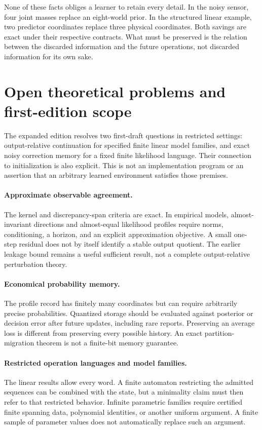 \documentclass[11pt,letterpaper]{article}
\theoremstyle{plain}
\theoremstyle{definition}
\begin{document}
None of these facts obliges a learner to retain every detail. In the noisy sensor, four joint masses replace an eight-world prior. In the structured linear example, two predictor coordinates replace three physical coordinates. Both savings are exact under their respective contracts. What must be preserved is the relation between the discarded information and the future operations, not discarded information for its own sake.

\section{Open theoretical problems and first-edition scope}\label{sec:open}
The expanded edition resolves two first-draft questions in restricted settings: output-relative continuation for specified finite linear model families, and exact noisy correction memory for a fixed finite likelihood language. Their connection to initialization is also explicit. This is not an implementation program or an assertion that an arbitrary learned environment satisfies those premises.

\paragraph{Approximate observable agreement.}
The kernel and discrepancy-span criteria are exact. In empirical models, almost-invariant directions and almost-equal likelihood profiles require norms, conditioning, a horizon, and an explicit approximation objective. A small one-step residual does not by itself identify a stable output quotient. The earlier leakage bound remains a useful sufficient result, not a complete output-relative perturbation theory.

\paragraph{Economical probability memory.}
The profile record has finitely many coordinates but can require arbitrarily precise probabilities. Quantized storage should be evaluated against posterior or decision error after future updates, including rare reports. Preserving an average loss is different from preserving every possible history. An exact partition-migration theorem is not a finite-bit memory guarantee.

\paragraph{Restricted operation languages and model families.}
The linear results allow every word. A finite automaton restricting the admitted sequences can be combined with the state, but a minimality claim must then refer to that restricted behavior. Infinite parametric families require certified finite spanning data, polynomial identities, or another uniform argument. A finite sample of parameter values does not automatically replace such an argument.
\end{document}

